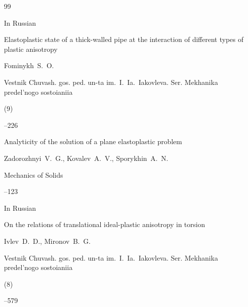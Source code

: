 






\begin{thebibliography}{99}






\lang In Russian

\paper Elastoplastic state of a thick-walled pipe at the interaction of different types of plastic anisotropy

\by Fominykh~S.~O.

\jour Vestnik Chuvash. gos. ped. un-ta im.~I.~Ia.~Iakovleva. Ser. Mekhanika predel'nogo sostoianiia


(9)

--226








\paper Analyticity of the solution of a plane elastoplastic problem

\by Zadorozhnyi~V.~G., Kovalev~A.~V., Sporykhin~A.~N.

\jour Mechanics of Solids




--123






\lang In Russian

\paper On the relations of translational ideal-plastic anisotropy in torsion

\by Ivlev~D.~D., Mironov~B.~G.

\jour Vestnik Chuvash. gos. ped. un-ta im.~I.~Ia.~Iakovleva. Ser. Mekhanika predel'nogo sostoianiia


(8)

--579








\end{thebibliography}
